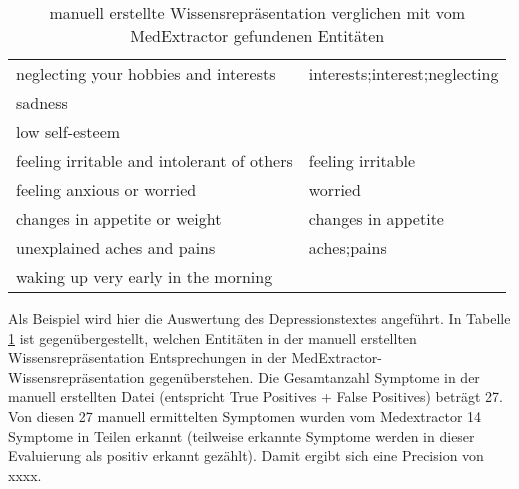 \begin{table}
\begin{center}
\begin{tabular}{ll}
             neglecting your hobbies and interests & interests;interest;neglecting \\
                                           sadness &                               \\
                                   low self-esteem &                               \\
        feeling irritable and intolerant of others &             feeling irritable \\
                        feeling anxious or worried &                       worried \\
                     changes in appetite or weight &           changes in appetite \\
                       unexplained aches and pains &                   aches;pains \\
               waking up very early in the morning &                               \\
\bottomrule
\end{tabular}
\caption{manuell erstellte Wissensrepräsentation verglichen mit vom MedExtractor gefundenen Entitäten}
\label{tab:vergleich_manuell_medextractor}
\end{center}
\end{table}

Als Beispiel wird hier die Auswertung des Depressionstextes angeführt. In Tabelle \ref{tab:vergleich_manuell_medextractor} ist gegenübergestellt, welchen Entitäten in der manuell erstellten Wissensrepräsentation Entsprechungen in der MedExtractor-Wissensrepräsentation gegenüberstehen. Die Gesamtanzahl Symptome in der manuell erstellten Datei (entspricht True Positives + False Positives) beträgt 27. Von diesen 27 manuell ermittelten Symptomen wurden vom Medextractor 14 Symptome in Teilen erkannt (teilweise erkannte Symptome werden in dieser Evaluierung als positiv erkannt gezählt). Damit ergibt sich eine Precision von xxxx.



